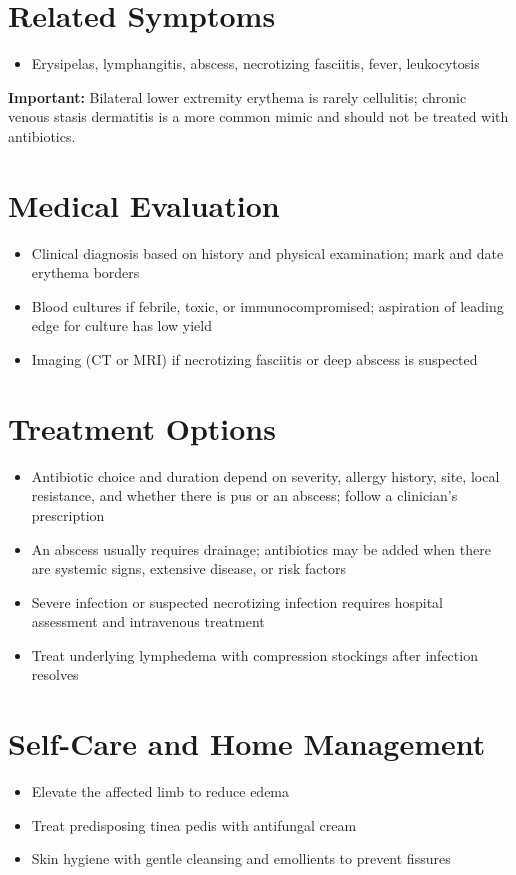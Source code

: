 \section*{Related Symptoms}
\begin{itemize}
  \item Erysipelas, lymphangitis, abscess, necrotizing fasciitis, fever, leukocytosis
\end{itemize}
\textbf{Important:} Bilateral lower extremity erythema is rarely cellulitis; chronic venous stasis dermatitis is a more common mimic and should not be treated with antibiotics.

\section*{Medical Evaluation}
\begin{itemize}
  \item Clinical diagnosis based on history and physical examination; mark and date erythema borders
  \item Blood cultures if febrile, toxic, or immunocompromised; aspiration of leading edge for culture has low yield
  \item Imaging (CT or MRI) if necrotizing fasciitis or deep abscess is suspected
\end{itemize}

\section*{Treatment Options}
\begin{itemize}
  \item Antibiotic choice and duration depend on severity, allergy history, site, local resistance, and whether there is pus or an abscess; follow a clinician's prescription
  \item An abscess usually requires drainage; antibiotics may be added when there are systemic signs, extensive disease, or risk factors
  \item Severe infection or suspected necrotizing infection requires hospital assessment and intravenous treatment
  \item Treat underlying lymphedema with compression stockings after infection resolves
\end{itemize}

\section*{Self-Care and Home Management}
\begin{itemize}
  \item Elevate the affected limb to reduce edema
  \item Treat predisposing tinea pedis with antifungal cream
  \item Skin hygiene with gentle cleansing and emollients to prevent fissures
\end{itemize}


